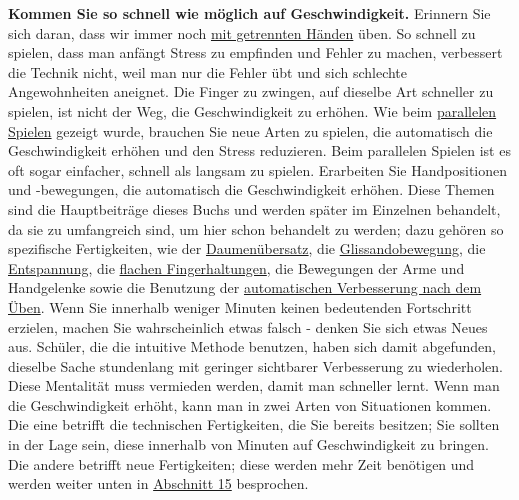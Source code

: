 \textbf{Kommen Sie so schnell wie möglich auf Geschwindigkeit.} Erinnern Sie sich daran, dass wir immer noch \hyperref[c1ii7]{mit getrennten Händen} üben.
So schnell zu spielen, dass man anfängt Stress zu empfinden und Fehler zu machen, verbessert die Technik nicht, weil man nur die Fehler übt und sich schlechte Angewohnheiten aneignet.
Die Finger zu zwingen, auf dieselbe Art schneller zu spielen, ist nicht der Weg, die Geschwindigkeit zu erhöhen.
Wie beim \hyperref[c1ii11]{parallelen Spielen} gezeigt wurde, brauchen Sie neue Arten zu spielen, die automatisch die Geschwindigkeit erhöhen und den Stress reduzieren.
Beim parallelen Spielen ist es oft sogar einfacher, schnell als langsam zu spielen.
Erarbeiten Sie Handpositionen und -bewegungen, die automatisch die Geschwindigkeit erhöhen.
Diese Themen sind die Hauptbeiträge dieses Buchs und werden später im Einzelnen behandelt, da sie zu umfangreich sind, um hier schon behandelt zu werden; dazu gehören so spezifische Fertigkeiten, wie der \hyperref[c1iii5b]{Daumenübersatz}, die \hyperref[c1iii5c]{Glissandobewegung}, die \hyperref[c1ii14]{Entspannung}, die \hyperref[c1iii4b]{flachen Fingerhaltungen}, die Bewegungen der Arme und Handgelenke sowie die Benutzung der \hyperref[c1ii15]{automatischen Verbesserung nach dem Üben}.
Wenn Sie innerhalb weniger Minuten keinen bedeutenden Fortschritt erzielen, machen Sie wahrscheinlich etwas falsch - denken Sie sich etwas Neues aus.
Schüler, die die intuitive Methode benutzen, haben sich damit abgefunden, dieselbe Sache stundenlang mit geringer sichtbarer Verbesserung zu wiederholen.
Diese Mentalität muss vermieden werden, damit man schneller lernt.
Wenn man die Geschwindigkeit erhöht, kann man in zwei Arten von Situationen kommen.
Die eine betrifft die technischen Fertigkeiten, die Sie bereits besitzen; Sie sollten in der Lage sein, diese innerhalb von Minuten auf Geschwindigkeit zu bringen.
Die andere betrifft neue Fertigkeiten; diese werden mehr Zeit benötigen und werden weiter unten in \hyperref[c1ii15]{Abschnitt 15} besprochen.

